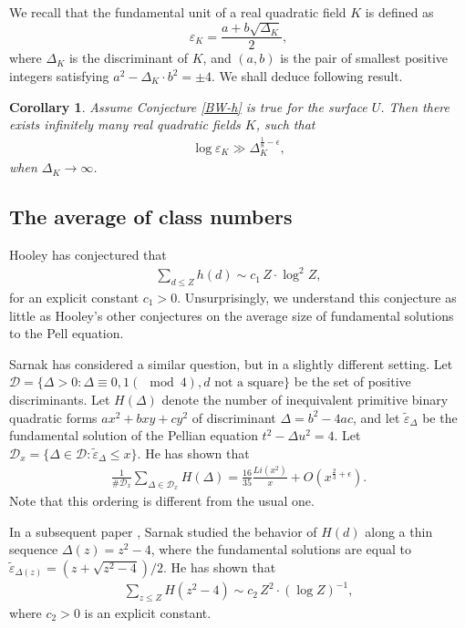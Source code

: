\documentclass[reqno, 11pt, twoside]{amsart}
\let\mathcal\mathscr
\numberwithin{equation}{section}
\newtheorem{corollary}[theorem]{Corollary}
\theoremstyle{definition}
\renewcommand{\leq}{\leqslant}
\newcommand{\eps}{\varepsilon}
\begin{document}
We recall that the fundamental unit of a real quadratic field $K$ is defined as
$$\eps_K = \frac{a+b\sqrt{\Delta_K}}{2},$$
where $\Delta_K$ is the discriminant of $K$, and $(a,b)$ is the pair of smallest positive integers satisfying
$a^2 - \Delta_K \cdot  b^2 = \pm 4$. 
We shall deduce following result.

\begin{corollary}
	Assume Conjecture \ref{BW-h} is true for the surface $U$. Then there exists infinitely many real quadratic fields $K$, such that 
 \begin{eqnarray}\label{rqf}
     \log \eps_K \gg \Delta_K^{\frac{1}{8} - \epsilon},
 \end{eqnarray}
 when $\Delta_K \rightarrow \infty$.
\end{corollary}


\subsection{The average of class numbers}

Hooley \cite[Conjecture 7]{Hoo} has conjectured that
\begin{eqnarray*}
	\sum_{d \leq Z} h(d) \sim c_1 \, Z \cdot \log^2 Z,
\end{eqnarray*}
for an explicit constant $c_1 > 0$.
Unsurprisingly, we understand this conjecture as little as Hooley's other conjectures on the average size of fundamental solutions to the Pell equation.

Sarnak \cite{Sar1} has considered a similar question, but in a slightly different setting. Let $\mathcal{D} = \{ \Delta > 0: \Delta \equiv 0, 1 ( \mod 4), d \text{ not a square} \}$ be the set of positive discriminants. Let $H(\Delta)$ denote the number of inequivalent primitive binary quadratic forms $ax^2 + bxy + cy^2$ of discriminant $\Delta = b^2-4ac$, and let $\tilde{\eps}_\Delta$ be the fundamental solution of the Pellian equation $t^2 - \Delta u^2 = 4$. Let $\mathcal{D}_x = \{\Delta \in \mathcal{D}: \tilde{\eps}_\Delta \leq x\}$. He has shown that
\begin{eqnarray*}
	\frac{1}{\# \mathcal{D}_x} \sum_{\Delta \in \mathcal{D}_x} H(\Delta) = \frac{16}{35} \frac{Li(x^2)}{x} + O(x^{\frac{2}{3} + \epsilon}).
\end{eqnarray*} 
Note that this ordering is different from the usual one.

In a subsequent paper \cite{Sar2}, Sarnak studied the behavior of $H(d)$ along a thin sequence $\Delta(z) = z^2 - 4$, where the fundamental solutions are equal to $\tilde{\eps}_{\Delta(z)} = (z + \sqrt{z^2-4})/2$. He has shown that
\begin{eqnarray*}
	\sum_{z \leq Z} H(z^2 - 4) \sim c_2 \, Z^2 \cdot (\log Z)^{-1},
\end{eqnarray*} 
where $c_2 > 0$ is an explicit constant.
\end{document}
